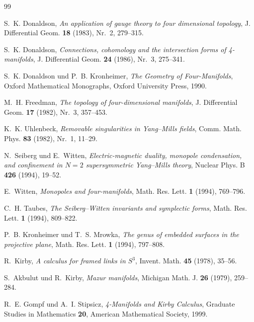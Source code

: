 \documentclass[12pt,a4paper]{amsart}
\theoremstyle{definition}
\theoremstyle{remark}
\begin{document}
\begin{thebibliography}{99}

S.~K. Donaldson,
\textit{An application of gauge theory to four dimensional topology},
J. Differential Geom. \textbf{18} (1983), Nr.~2, 279--315.

S.~K. Donaldson,
\textit{Connections, cohomology and the intersection forms of 4-manifolds},
J. Differential Geom. \textbf{24} (1986), Nr.~3, 275--341.

S.~K. Donaldson und P.~B. Kronheimer,
\textit{The Geometry of Four-Manifolds},
Oxford Mathematical Monographs, Oxford University Press, 1990.

M.~H. Freedman,
\textit{The topology of four-dimensional manifolds},
J. Differential Geom. \textbf{17} (1982), Nr.~3, 357--453.

K.~K. Uhlenbeck,
\textit{Removable singularities in Yang--Mills fields},
Comm. Math. Phys. \textbf{83} (1982), Nr.~1, 11--29.

N.~Seiberg und E.~Witten,
\textit{Electric-magnetic duality, monopole condensation, and confinement in
$N=2$ supersymmetric Yang--Mills theory},
Nuclear Phys. B \textbf{426} (1994), 19--52.

E.~Witten,
\textit{Monopoles and four-manifolds},
Math. Res. Lett. \textbf{1} (1994), 769--796.

C.~H. Taubes,
\textit{The Seiberg--Witten invariants and symplectic forms},
Math. Res. Lett. \textbf{1} (1994), 809--822.

P.~B. Kronheimer und T.~S. Mrowka,
\textit{The genus of embedded surfaces in the projective plane},
Math. Res. Lett. \textbf{1} (1994), 797--808.

R.~Kirby,
\textit{A calculus for framed links in $S^3$},
Invent. Math. \textbf{45} (1978), 35--56.

S.~Akbulut und R.~Kirby,
\textit{Mazur manifolds},
Michigan Math. J. \textbf{26} (1979), 259--284.

R.~E. Gompf und A.~I. Stipsicz,
\textit{4-Manifolds and Kirby Calculus},
Graduate Studies in Mathematics \textbf{20},
American Mathematical Society, 1999.

\end{thebibliography}
\end{document}
